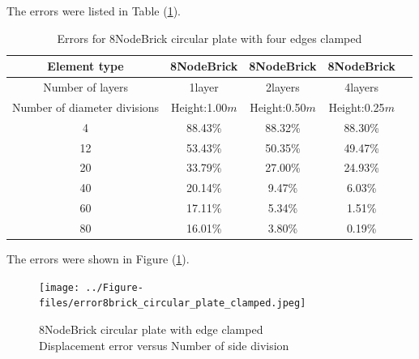 \documentclass[fleqn,11pt]{article}
\begin{document}
The errors were listed in Table (\ref{table errors for 8NodeBrick circular plate with four edges clamped}).

\begin{table}[H]
  \centering
      \caption{Errors for 8NodeBrick circular plate with four edges clamped}
  \label{table errors for 8NodeBrick circular plate with four edges clamped}
\begin{tabular}{|c|c|c|c|c|}
\hline
Element type     & 8NodeBrick     & 8NodeBrick     & 8NodeBrick      \\ \hline
Number of layers & 1layer         & 2layers         & 4layers          \\ \hline
Number of diameter divisions & Height:1.00$m$ & Height:0.50$m$ & Height:0.25$m$  \\ \hline
4           & 88.43\% & 88.32\% & 88.30\%       \\ \hline
12          & 53.43\% & 50.35\% & 49.47\%       \\ \hline
20          & 33.79\% & 27.00\% & 24.93\%       \\ \hline
40          & 20.14\% & 9.47\%  & 6.03\%        \\ \hline
60          & 17.11\% & 5.34\%  & 1.51\%        \\ \hline
80          & 16.01\% & 3.80\%  & 0.19\%        \\
\hline
\end{tabular}
\end{table}



The errors were shown in Figure (\ref{fig 8NodeBrick circular plate with edge clamped}).
\begin{figure}[H]
    \centering
    \texttt{[image: ../Figure-files/error8brick\_circular\_plate\_clamped.jpeg]}
  \captionsetup{justification=centering,margin=3cm}
  \caption{8NodeBrick circular plate with edge clamped\\
      Displacement error   versus   Number of side division}
  \label{fig 8NodeBrick circular plate with edge clamped}
\end{figure}
\end{document}
